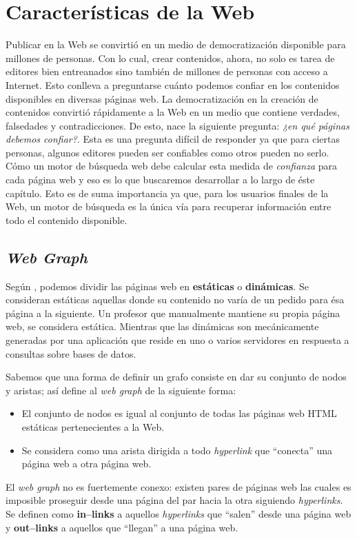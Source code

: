 \section{Características de la Web}
	Publicar en la Web se convirtió en un medio de democratización disponible para millones de personas. Con lo cual, crear contenidos, ahora, no solo es tarea de editores bien entreanados sino también de millones de personas con acceso a Internet. Esto conlleva a preguntarse cuánto podemos confiar en los contenidos disponibles en diversas páginas web. La democratización en la creación de contenidos convirtió rápidamente a la Web en un medio que contiene verdades, falsedades y contradicciones. De esto, nace la siguiente pregunta: \textit{¿en qué páginas debemos confiar?}. Esta es una pregunta difícil de responder ya que para ciertas personas, algunos editores pueden ser confiables como otros pueden no serlo. Cómo un motor de búsqueda web debe calcular esta medida de \textit{confianza} para cada página web y eso es lo que buscaremos desarrollar a lo largo de éste capítulo. Esto es de suma importancia ya que, para los usuarios finales de la Web, un motor de búsqueda es la única vía para recuperar información entre todo el contenido disponible.
	
\subsection{\textit{Web Graph}}
	Según \cite{manning2009}, podemos dividir las páginas web en \textbf{estáticas} o \textbf{dinámicas}. Se consideran estáticas aquellas donde su contenido no varía de un pedido para ésa página a la siguiente. Un profesor que manualmente mantiene su propia página web, se considera estática. Mientras que las dinámicas son mecánicamente generadas por una aplicación que reside en uno o varios servidores en respuesta a consultas sobre bases de datos. \par
	
	Sabemos que una forma de definir un grafo consiste en dar su conjunto de nodos y aristas; así \cite{manning2009} define al \textit{web graph} de la siguiente forma:
	\begin{itemize}
		\item El conjunto de nodos es igual al conjunto de todas las páginas web HTML estáticas pertenecientes a la Web.
		\item Se considera como una arista dirigida a todo \textit{hyperlink} que \enquote{conecta} una página web a otra página web.
	\end{itemize}
	El \textit{web graph} no es fuertemente conexo: existen pares de páginas web las cuales es imposible proseguir desde una página del par hacia la otra siguiendo \textit{hyperlinks}. Se definen como \textbf{in--links} a aquellos \textit{hyperlinks} que \enquote{salen} desde una página web y \textbf{out--links} a aquellos que \enquote{llegan} a una página web.
	
